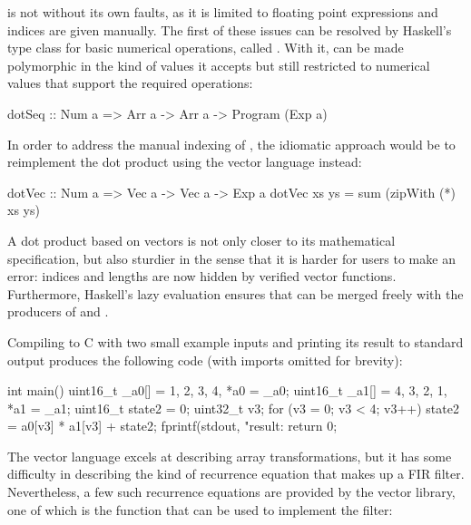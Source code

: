 \documentclass[../paper.tex]{subfiles}
\begin{document}
 is not without its own faults, as it is limited to floating point expressions and indices are given manually. The first of these issues can be resolved by Haskell's type class for basic numerical operations, called . With it,  can be made polymorphic in the kind of values it accepts but still restricted to numerical values that support the required operations:

\begin{code}
dotSeq :: Num a => Arr a -> Arr a -> Program (Exp a)
\end{code}

\noindent In order to address the manual indexing of , the idiomatic approach would be to reimplement the dot product using the vector language instead:

\begin{code}
dotVec :: Num a => Vec a -> Vec a -> Exp a
dotVec xs ys = sum (zipWith (*) xs ys)
\end{code}

A dot product based on vectors is not only closer to its mathematical specification, but also sturdier in the sense that it is harder for users to make an error: indices and lengths are now hidden by verified vector functions. Furthermore, Haskell's lazy evaluation ensures that  can be merged freely with the producers of  and .

Compiling  to C with two small example inputs and printing its result to standard output produces the following code (with imports omitted for brevity):

\begin{code}
int main() {
  uint16_t _a0[] = {1, 2, 3, 4}, *a0 = _a0;
  uint16_t _a1[] = {4, 3, 2, 1}, *a1 = _a1;
  uint16_t state2 = 0;
  uint32_t v3;
  for (v3 = 0; v3 < 4; v3++)
    state2 = a0[v3] * a1[v3] + state2;
  fprintf(stdout, "result: %
  return 0;
}
\end{code}

The vector language excels at describing array transformations, but it has some difficulty in describing the kind of recurrence equation that makes up a FIR filter. Nevertheless, a few such recurrence equations are provided by the vector library, one of which is the  function that can be used to implement the filter:

\end{document}

